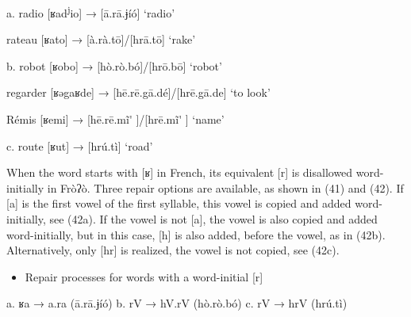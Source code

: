 \begin{styleindexi}
        a.  radio             [ʁad\textsuperscript{j}io]         →         [ā.rā.ɉíó]                             ‘radio’
\end{styleindexi}

\begin{styleindexi}
            rateau           [ʁato]             →         [à.rà.tō]/[hrā.tō]                     ‘rake’ 
\end{styleindexi}

\begin{styleindexi}
        b.   robot             [ʁobo]          →         [hò.rò.bó]/[hrō.bō]                ‘robot’  
\end{styleindexi}

\begin{styleindexi}
            regarder       [ʁəgaʁde]      →         [hē.rē.gā.dé]/[hrē.gā.de]        ‘to look’  
\end{styleindexi}

\begin{styleindexi}
            Rémis           [ʁemi]          →         [hē.rē.mĩ\'{} ]/[hrē.mĩ\'{} ]               ‘name’ 
\end{styleindexi}

\begin{styleindexi}
         c.  route             [ʁut]            →         [hrú.tì]                                ‘road’       
\end{styleindexi}

When the word starts with [ʁ] in French, its equivalent [r] is disallowed word-initially in Fròʔò. Three repair options are available, as shown in (41) and (42). If [a] is the first vowel of the first syllable, this vowel is copied and added word-initially, see (42a). If the vowel is not [a], the vowel is also copied and added word-initially, but in this case, [h] is also added, before the vowel, as in (42b). Alternatively, only [hr] is realized, the vowel is not copied, see (42c).

\begin{itemize}
\item \begin{styleindexi}
   \label{bkm:Ref486146129}Repair processes for words with a word-initial [r]
\end{styleindexi}\end{itemize}
\begin{styleindexi}
a.      ʁa   →  a.ra (ā.rā.ɉíó)       b. rV   →  hV.rV (hò.rò.bó)      c.  rV   →  hrV (hrú.tì)
\end{styleindexi}

